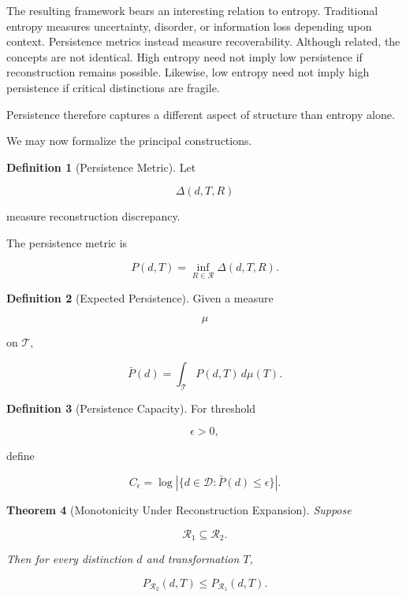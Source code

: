 \documentclass[12pt,oneside]{article}
\newtheorem{theorem}{Theorem}[section] \newtheorem{lemma}[theorem]{Lemma} \newtheorem{proposition}[theorem]{Proposition} \newtheorem{corollary}[theorem]{Corollary}
\theoremstyle{definition}
\newtheorem{definition}[theorem]{Definition} \newtheorem{axiom}[theorem]{Axiom} \newtheorem{remark}[theorem]{Remark} \newtheorem{example}[theorem]{Example}
\begin{document}
The resulting framework bears an interesting relation to entropy. Traditional entropy measures uncertainty, disorder, or information loss depending upon context. Persistence metrics instead measure recoverability. Although related, the concepts are not identical. High entropy need not imply low persistence if reconstruction remains possible. Likewise, low entropy need not imply high persistence if critical distinctions are fragile.

Persistence therefore captures a different aspect of structure than entropy alone.

We may now formalize the principal constructions.

\begin{definition}[Persistence Metric]

Let

\[
\Delta(d,T,R)
\]

measure reconstruction discrepancy.

The persistence metric is

\[
P(d,T)
=
\inf_{R\in\mathcal R}
\Delta(d,T,R).
\]

\end{definition}

\begin{definition}[Expected Persistence]

Given a measure

\[
\mu
\]

on \(\mathcal T\),

\[
\bar P(d)
=
\int_{\mathcal T}
P(d,T)
\,d\mu(T).
\]

\end{definition}

\begin{definition}[Persistence Capacity]

For threshold

\[
\epsilon>0,
\]

define

\[
C_\epsilon
=
\log
\left|
\{
d\in\mathcal D
:
\bar P(d)\le\epsilon
\}
\right|.
\]

\end{definition}

\begin{theorem}[Monotonicity Under Reconstruction Expansion]

Suppose

\[
\mathcal R_1
\subseteq
\mathcal R_2.
\]

Then for every distinction \(d\) and transformation \(T\),

\[
P_{\mathcal R_2}(d,T)
\le
P_{\mathcal R_1}(d,T).
\]

\end{theorem}
\end{document}
